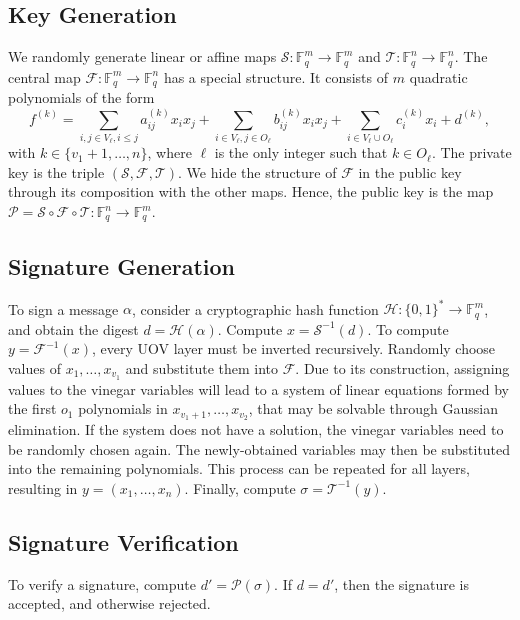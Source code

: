 \documentclass[12pt]{article}
\begin{document}
\subsection{Key Generation}
We randomly generate linear or affine maps $\mathcal{S}: \mathbb{F}_{q}^{m} \rightarrow \mathbb{F}_{q}^{m}$ and $\mathcal{T}: \mathbb{F}_{q}^{n} \rightarrow \mathbb{F}_{q}^{n}$. The central map $\mathcal{F}: \mathbb{F}_{q}^{m} \rightarrow \mathbb{F}_{q}^{n}$
has a special structure. It consists of $m$ quadratic polynomials of the form
\begin{equation}\label{eq:0}
f^{(k)} = \sum_{i, j \in V_{\ell}, i \leq j} a_{ij}^{(k)} x_{i} x_{j}
        + \sum_{i \in V_{\ell}, j \in O_{\ell}} b_{ij}^{(k)} x_{i} x_{j}
        + \sum_{i \in V_{\ell} \cup O_{\ell}} c_{i}^{(k)} x_{i} + d^{(k)},
\end{equation}
with $k \in \{v_{1} + 1, \dots, n\}$, where $\ell$ is the only integer such that $k \in O_{\ell}$. The private key is the triple $(\mathcal{S}, \mathcal{F}, \mathcal{T})$. We hide the structure of $\mathcal{F}$ in the public key through its composition with the other maps. Hence, the public key is the map $\mathcal{P} = \mathcal{S} \circ \mathcal{F} \circ \mathcal{T} : \mathbb{F}_{q}^{n} \rightarrow \mathbb{F}_{q}^{m}$.

\subsection{Signature Generation} 
To sign a message $\alpha$, consider a cryptographic hash function $\mathcal{H} : \{0, 1\}^{*} \rightarrow \mathbb{F}_{q}^{m}$, and obtain the digest $d = \mathcal{H}(\alpha)$. Compute $x = \mathcal{S}^{-1}(d)$. To compute $y = \mathcal{F}^{-1}(x)$, every UOV layer must be inverted recursively. Randomly choose values of $x_{1}, \dots, x_{v_{1}}$ and substitute them into $\mathcal{F}$. Due to its construction, assigning values to the vinegar variables will lead to a system of linear equations formed by the first $o_{1}$ polynomials in $x_{v_{1} + 1}, \dots, x_{v_{2}}$, that may be solvable through Gaussian elimination. If the system does not have a solution, the vinegar variables need to be randomly chosen again. The newly-obtained variables may then be substituted into the remaining polynomials. This process can be repeated for all layers, resulting in $y = (x_{1}, \dots, x_{n})$. Finally, compute $\sigma = \mathcal{T}^{-1}(y)$.

\subsection{Signature Verification}
To verify a signature, compute $d' = \mathcal{P}(\sigma)$. If $d = d'$, then the signature is accepted, and otherwise rejected.
\end{document}
